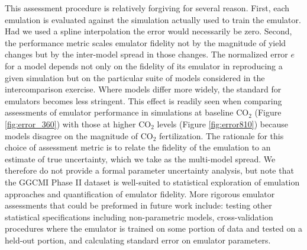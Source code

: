 \documentclass[esd, final]{copernicus} %
\begin{document}
This assessment procedure is relatively forgiving for several reason. First, each emulation is evaluated against the simulation actually used to train the emulator. Had we used a spline interpolation the error would necessarily be zero. Second, the performance metric scales emulator fidelity not by the magnitude of yield changes but by the inter-model spread in those changes. The normalized error $e$ for a model depends not only on the fidelity of its emulator in reproducing a given simulation but on the particular suite of models considered in the intercomparison exercise. Where models differ more widely, the standard for emulators becomes less stringent. This effect is readily seen when comparing assessments of emulator performance in simulations at baseline CO$_2$ (Figure \ref{fig:error_360}) with those at higher CO$_2$ levels (Figure \ref{fig:error810}) because models disagree on the magnitude of CO$_2$ fertilization. The rationale for this choice of assessment metric is to relate the fidelity of the emulation to an estimate of true uncertainty, which we take as the multi-model spread. We therefore do not provide a formal parameter uncertainty analysis, but note that the GGCMI Phase II dataset is well-suited to statistical exploration of emulation approaches and quantification of emulator fidelity. More rigorous emulator assessments that could be preformed in future work include: testing other statistical specifications including non-parametric models, cross-validation procedures where the emulator is trained on some portion of data and tested on a held-out portion, and calculating standard error on emulator parameters.
\noappendix %


\end{document}
